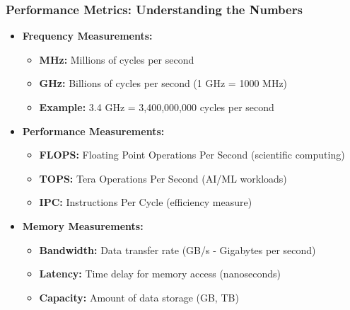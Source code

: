 \begin{frame}
\frametitle{Performance Metrics: Understanding the Numbers}
\begin{itemize}
    \item \textbf{Frequency Measurements:}
    \begin{itemize}
        \item \textbf{MHz:} Millions of cycles per second
        \item \textbf{GHz:} Billions of cycles per second (1 GHz = 1000 MHz)
        \item \textbf{Example:} 3.4 GHz = 3,400,000,000 cycles per second
    \end{itemize}
    \item \textbf{Performance Measurements:}
    \begin{itemize}
        \item \textbf{FLOPS:} Floating Point Operations Per Second (scientific computing)
        \item \textbf{TOPS:} Tera Operations Per Second (AI/ML workloads)
        \item \textbf{IPC:} Instructions Per Cycle (efficiency measure)
    \end{itemize}
    \item \textbf{Memory Measurements:}
    \begin{itemize}
        \item \textbf{Bandwidth:} Data transfer rate (GB/s - Gigabytes per second)
        \item \textbf{Latency:} Time delay for memory access (nanoseconds)
        \item \textbf{Capacity:} Amount of data storage (GB, TB)
    \end{itemize}
\end{itemize}
\end{frame}

